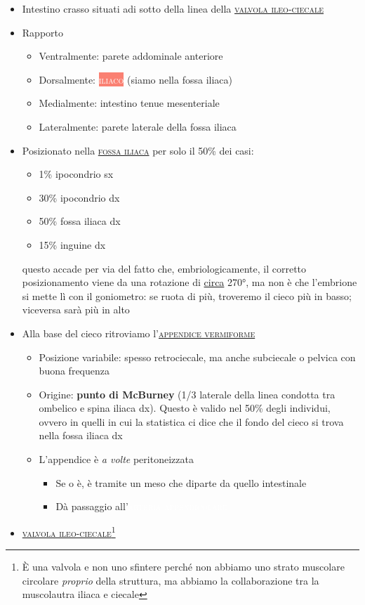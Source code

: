 \documentclass[italian,]{article}
\providecommand{\tightlist}{%
  \setlength{\itemsep}{0pt}\setlength{\parskip}{0pt}}
\newcommand{\mus}[1]{\colorbox{Salmon}{\textcolor{white}{\textsc{#1}}}}
\newcommand{\art}[1]{\colorbox{RedOrange}{\textcolor{white}{\textsc{#1}}}}
\renewcommand{\a}[1]{\underline{\textsc{#1}}}
\begin{document}
\begin{itemize}
\tightlist
\item
  Intestino crasso situati adi sotto della linea della
  \a{valvola ileo-ciecale}
\item
  Rapporto

  \begin{itemize}
  \tightlist
  \item
    Ventralmente: parete addominale anteriore
  \item
    Dorsalmente: \mus{iliaco} (siamo nella fossa iliaca)
  \item
    Medialmente: intestino tenue mesenteriale
  \item
    Lateralmente: parete laterale della fossa iliaca
  \end{itemize}
\item
  Posizionato nella \a{fossa iliaca} per solo il 50\% dei casi:

  \begin{itemize}
  \tightlist
  \item
    1\% ipocondrio sx
  \item
    30\% ipocondrio dx
  \item
    50\% fossa iliaca dx
  \item
    15\% inguine dx
  \end{itemize}

  questo accade per via del fatto che, embriologicamente, il corretto
  posizionamento viene da una rotazione di \underline{circa} 270°, ma
  non è che l'embrione si mette lì con il goniometro: se ruota di più,
  troveremo il cieco più in basso; viceversa sarà più in alto
\item
  Alla base del cieco ritroviamo l'\a{appendice vermiforme}

  \begin{itemize}
  \tightlist
  \item
    Posizione variabile: spesso retrociecale, ma anche subciecale o
    pelvica con buona frequenza
  \item
    Origine: \textbf{punto di McBurney} (1/3 laterale della linea
    condotta tra ombelico e spina iliaca dx). Questo è valido nel 50\%
    degli individui, ovvero in quelli in cui la statistica ci dice che
    il fondo del cieco si trova nella fossa iliaca dx
  \item
    L'appendice è \emph{a volte} peritoneizzata

    \begin{itemize}
    \tightlist
    \item
      Se o è, è tramite un meso che diparte da quello intestinale
    \item
      Dà passaggio all'\art{arteria appendicolare}
    \end{itemize}
  \end{itemize}
\item
  \a{valvola ileo-ciecale}\footnote{È una valvola e non uno sfintere
    perché non abbiamo uno strato muscolare circolare \emph{proprio}
    della struttura, ma abbiamo la collaborazione tra la muscolautra
    iliaca e ciecale}


\end{itemize}
\end{document}
